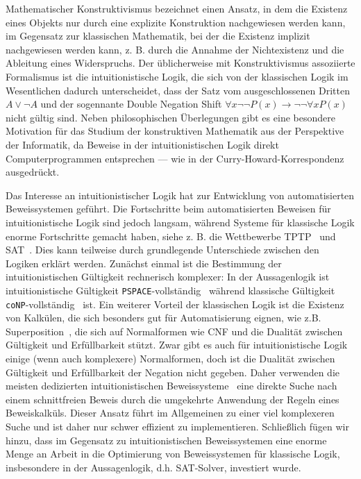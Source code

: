 \documentclass[a4paper,11pt]{report}
\theoremstyle{definition}
\theoremstyle{definition}
\theoremstyle{definition}
\theoremstyle{definition}
\theoremstyle{definition}
\theoremstyle{definition}
\theoremstyle{definition}
\begin{document}
	Mathematischer Konstruktivismus bezeichnet einen Ansatz, in dem die Existenz eines Objekts nur durch eine explizite Konstruktion nachgewiesen werden kann, im Gegensatz zur klassischen Mathematik, bei der die Existenz implizit nachgewiesen werden kann, z. B. durch die Annahme der Nichtexistenz und die Ableitung eines Widerspruchs.
	Der üblicherweise mit Konstruktivismus assoziierte Formalismus ist die intuitionistische Logik, die sich von der klassischen Logik im Wesentlichen dadurch unterscheidet, dass der Satz vom ausgeschlossenen Dritten $A\vee\neg A$ und der sogennante Double Negation Shift $\forall x\neg\neg P(x)\to\neg\neg\forall xP(x)$ nicht gültig sind.
	Neben philosophischen Überlegungen gibt es eine besondere Motivation für das Studium der konstruktiven Mathematik aus der Perspektive der Informatik, da Beweise in der intuitionistischen Logik direkt Computerprogrammen entsprechen --- wie in der Curry-Howard-Korrespondenz~\cite{howard1980formulae} ausgedrückt.
	
	Das Interesse an intuitionistischer Logik hat zur Entwicklung von automatisierten Beweissystemen geführt.
	Die Fortschritte beim automatisierten Beweisen für intuitionistische Logik sind jedoch langsam, während Systeme für klassische Logik enorme Fortschritte gemacht haben, siehe z. B. die Wettbewerbe TPTP~\cite{casc} und SAT~\cite{satc}.
	Dies kann teilweise durch grundlegende Unterschiede zwischen den Logiken erklärt werden.
	Zunächst einmal ist die Bestimmung der intuitionistischen Gültigkeit rechnerisch komplexer: In der Aussagenlogik ist intuitionistische Gültigkeit \verb+PSPACE+-vollständig~\cite{statman1979intuitionistic} während klassische Gültigkeit \verb+coNP+-vollständig~\cite{cook1971complexity} ist.
	Ein weiterer Vorteil der klassischen Logik ist die Existenz von Kalkülen, die sich besonders gut für Automatisierung eignen, wie z.B. Superposition~\cite{bachmair2001resolution}, die sich auf Normalformen wie CNF und die Dualität zwischen Gültigkeit und Erfüllbarkeit stützt.
	Zwar gibt es auch für intuitionistische Logik einige (wenn auch komplexere) Normalformen, doch ist die Dualität zwischen Gültigkeit und Erfüllbarkeit der Negation nicht gegeben.
	Daher verwenden die meisten dedizierten intuitionistischen Beweissysteme~\cite{mclaughlin2009efficient, tammet1996resolution} eine direkte Suche nach einem schnittfreien Beweis durch die umgekehrte Anwendung der Regeln eines Beweiskalküls. Dieser Ansatz führt im Allgemeinen zu einer viel komplexeren Suche und ist daher nur schwer effizient zu implementieren.
	Schließlich fügen wir hinzu, dass im Gegensatz zu intuitionistischen Beweissystemen eine enorme Menge an Arbeit in die Optimierung von Beweissystemen für klassische Logik, insbesondere in der Aussagenlogik, d.h. SAT-Solver, investiert wurde.
	
\end{document}
